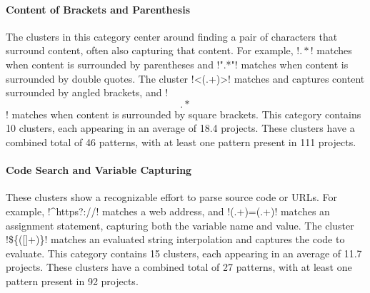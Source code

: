 \paragraph{Content of Brackets and Parenthesis}
\label{cluster:contentparens}
The clusters in this category center around finding a pair of characters that surround content, often also capturing that content. For example,
\cverb!\(.*\)! matches when content is surrounded by parentheses and \cverb!".*"! matches  when content is surrounded by double quotes.  The cluster \cverb!<(.+)>! matches and captures content surrounded by angled brackets, and \cverb!\[.*\]! matches when content is surrounded by square brackets.
This category contains 10 clusters, each appearing in an average of 18.4 projects.
 These clusters have a combined total of 46 patterns, with at least one pattern present in 111 projects.

\paragraph{Code Search and Variable Capturing}
\label{cluster:search}
These clusters show a recognizable effort to parse source code or URLs. For example,
\cverb!^https?://! matches a web address, and \cverb!(.+)=(.+)! matches an assignment statement, capturing both the variable name and value.
The cluster  \cverb!\$\{([\w\-]+)\}! matches an evaluated string interpolation and captures the code to evaluate.
This category contains 15 clusters, each appearing in an average of 11.7 projects.
These clusters have a combined total of 27 patterns, with at least one pattern present in 92 projects.
